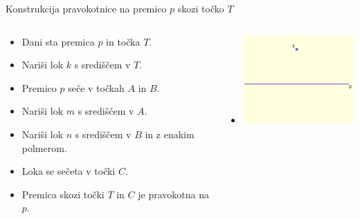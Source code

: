 \begin{frame}{Konstrukcija pravokotnice na premico $p$ skozi točko $T$}

	\begin{columns}[T] %
		\begin{column}{0.55\textwidth}
		  \begin{itemize}[<+->]
			\item Dani sta premica $p$ in točka $T$.
			\item Nariši lok $k$ s središčem v $T$.  
			\item Premico $p$ seče v točkah $A$ in $B$. 
			\item Nariši lok $m$ s središčem v $A$.
			\item Nariši lok $n$ s središčem v $B$ in z enakim polmerom.
			\item Loka se sečeta v točki $C$.
			\item Premica skozi točki $T$ in $C$ je pravokotna na $p$.
		  \end{itemize}
		\end{column}
	  
		\begin{column}{0.45\textwidth}
		  \begin{itemize}
			\item<1> \includegraphics[width=50mm]{slike/fig-1.png}
		  \end{itemize}
		\end{column}
	  \end{columns}

\end{frame}


